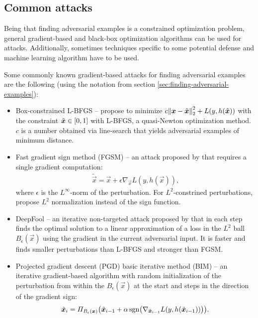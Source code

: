 \documentclass[oneside]{book}
\begin{document}
\subsection{Common attacks}

Being that finding adversarial examples is a constrained optimization problem, general gradient-based and black-box optimization algorithms can be used for attacks. Additionally, sometimes techniques specific to some potential defense and machine learning algorithm have to be used.

Some commonly known gradient-based attacks for finding adversarial examples are the following (using the notation from section \ref{sec:finding-adversarial-examples}):
\begin{itemize}
	\item Box-constrained L-BFGS -- \citet{Szegedy:2013:IPNN} propose to minimize $c\enVert{\vec x -\tilde{\vec x}}_2^2+L(y,h(\tilde{\vec x}))$ with the constraint $\tilde{\vec x}\in\intcc{0,1}$ with L-BFGS, a quasi-Newton optimization method. $c$ is a number obtained via line-search that yields adversarial examples of minimum distance.
	\item Fast gradient sign method (FGSM) -- an attack proposed by \citet{Goodfellow:2014:EHAE} that requires a single gradient computation:
	\begin{align}
	\tilde{\vec x} = \vec x + \epsilon\nabla_{\vec x} L(y,h(\vec x)) \text{,}
	\end{align} 
	where $\epsilon$ is the $L^\infty$-norm of the perturbation. For $L^2$-constrined perturbations, \citet{Miyato:2017:VATRMSSSL} propose $L^2$ normalization instead of the sign function.
	\item DeepFool -- an iterative non-targeted attack proposed by \citet{Moosavi-Dezfooli:2016:DFSAMFDNN} that in each step finds the optimal solution to a linear approximation of a loss in the $L^2$ ball $B_\epsilon(\vec x)$ using the gradient in the current adversarial input. It is faster and finds smaller perturbations than L-BFGS and stronger than FGSM.
	\item Projected gradient descent (PGD) \citep{Madry:2017:TDLMRAA} basic iterative method (BIM) \citep{Kurakin:2016:AEPW} -- an iterative gradient-based algorithm with random initialization \citep{Madry:2017:TDLMRAA} of the perturbation from within the $B_\epsilon(\vec x)$ at the start and steps in the direction of the gradient sign:
	\begin{equation} \label{eq:pgd}
	\tilde{\vec x}_i = \Pi_{B_\epsilon(\vec x)} \del{\tilde{\vec x}_{i-1} + \alpha\sgn\del{\nabla_{\tilde{\vec x}_{i-1}} L(y,h(\tilde{\vec x}_{i-1}))}} \text{.}

\end{equation}
\end{itemize}
\end{document}

